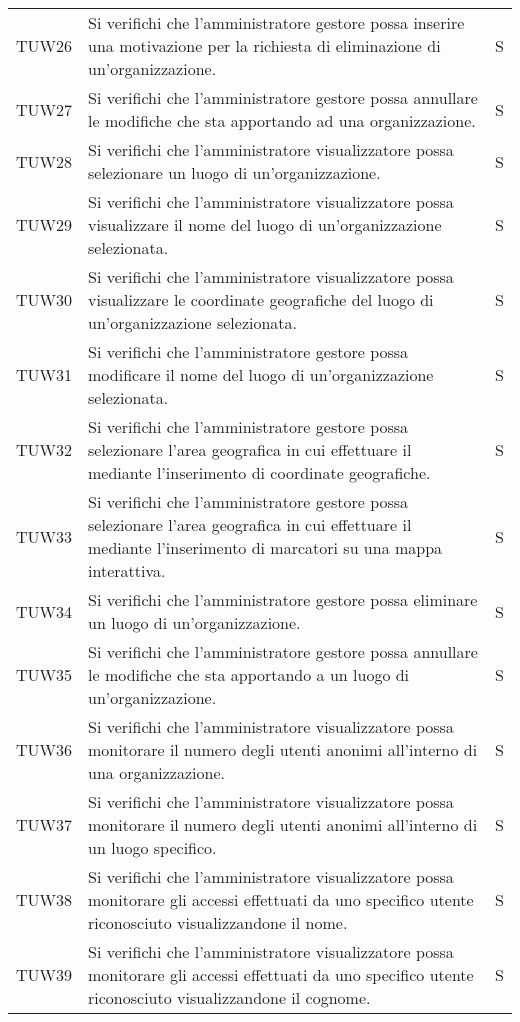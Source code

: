 {\begin{longtable}{ c C{13cm} C{1cm}}
TUW26 & Si verifichi che l'amministratore gestore possa inserire una motivazione per la richiesta di eliminazione di un'organizzazione. & S \\
TUW27 & Si verifichi che l'amministratore gestore possa annullare le modifiche che sta apportando ad una organizzazione. & S \\
TUW28 & Si verifichi che l’amministratore visualizzatore possa selezionare un luogo di un’organizzazione. & S \\
TUW29 & Si verifichi che l'amministratore visualizzatore possa visualizzare il nome del luogo di un’organizzazione selezionata. & S \\
TUW30 & Si verifichi che l'amministratore visualizzatore possa visualizzare le coordinate geografiche del luogo di un’organizzazione selezionata. & S \\
TUW31 & Si verifichi che l'amministratore gestore possa modificare il nome del luogo di un’organizzazione selezionata. & S \\
TUW32 & Si verifichi che l'amministratore gestore possa selezionare l'area geografica in cui effettuare il  mediante l'inserimento di coordinate geografiche. & S \\
TUW33 & Si verifichi che l'amministratore gestore possa selezionare l'area geografica in cui effettuare il  mediante l'inserimento di marcatori su una mappa interattiva. & S \\
TUW34 & Si verifichi che l'amministratore gestore possa eliminare un luogo di un’organizzazione. & S \\
TUW35 & Si verifichi che l'amministratore gestore possa annullare le modifiche che sta apportando a un luogo di un’organizzazione.  & S \\
TUW36 & Si verifichi che l’amministratore visualizzatore possa monitorare il numero degli utenti anonimi all’interno di una organizzazione. & S \\
TUW37 & Si verifichi che l’amministratore visualizzatore possa monitorare il numero degli utenti anonimi all’interno di un luogo specifico. & S \\
TUW38 & Si verifichi che l’amministratore visualizzatore possa monitorare gli accessi effettuati da uno specifico utente riconosciuto visualizzandone il nome. & S \\
TUW39 & Si verifichi che l’amministratore visualizzatore possa monitorare gli accessi effettuati da uno specifico utente riconosciuto visualizzandone il cognome. & S \\

\end{longtable}}

